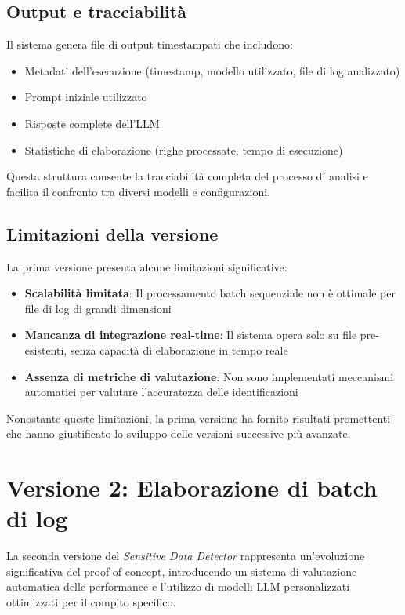 \documentclass[12pt]{report}
\begin{document}
\subsection{Output e tracciabilità}
\label{subsec:ver1_output}

Il sistema genera file di output timestampati che includono:
\begin{itemize}
    \item Metadati dell'esecuzione (timestamp, modello utilizzato, file di log analizzato)
    \item Prompt iniziale utilizzato
    \item Risposte complete dell'LLM
    \item Statistiche di elaborazione (righe processate, tempo di esecuzione)
\end{itemize}

Questa struttura consente la tracciabilità completa del processo di analisi e facilita il confronto tra diversi modelli e configurazioni.

\subsection{Limitazioni della versione}
\label{subsec:ver1_limitazioni}

La prima versione presenta alcune limitazioni significative:

\begin{itemize}
    \item \textbf{Scalabilità limitata}: Il processamento batch sequenziale non è ottimale per file di log di grandi dimensioni
    \item \textbf{Mancanza di integrazione real-time}: Il sistema opera solo su file pre-esistenti, senza capacità di elaborazione in tempo reale
    \item \textbf{Assenza di metriche di valutazione}: Non sono implementati meccanismi automatici per valutare l'accuratezza delle identificazioni
\end{itemize}

Nonostante queste limitazioni, la prima versione ha fornito risultati promettenti che hanno giustificato lo sviluppo delle versioni successive più avanzate.

\section{Versione 2: Elaborazione di batch di log}
\label{sec:ver2}

La seconda versione del \textit{Sensitive Data Detector} rappresenta un'evoluzione significativa del proof of concept, introducendo un sistema di valutazione automatica delle performance e l'utilizzo di modelli LLM personalizzati ottimizzati per il compito specifico.
\end{document}

